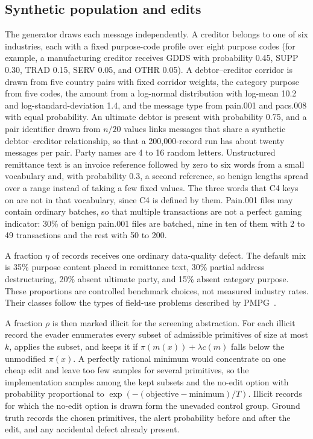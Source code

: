 \documentclass[conference]{IEEEtran}
\begin{document}
\subsection{Synthetic population and edits}
The generator draws each message independently. A creditor belongs to one of
six industries, each with a fixed purpose-code profile over eight purpose
codes (for example, a manufacturing creditor receives GDDS with probability
0.45, SUPP 0.30, TRAD 0.15, SERV 0.05, and OTHR 0.05). A debtor--creditor
corridor is drawn from five country pairs with fixed corridor weights, the
category purpose from five codes, the amount from a log-normal distribution
with log-mean 10.2 and log-standard-deviation 1.4, and the message type from
pain.001 and pacs.008 with equal probability. An ultimate debtor is present
with probability 0.75, and a pair identifier drawn from $n/20$ values links
messages that share a synthetic debtor--creditor relationship, so that a
200,000-record run has about twenty messages per pair. Party names are 4 to
16 random letters. Unstructured remittance text is an invoice reference
followed by zero to six words from a small vocabulary and, with probability
0.3, a second reference, so benign lengths spread over a range instead of
taking a few fixed values. The three words that C4 keys on are not in that
vocabulary, since C4 is defined by them. Pain.001 files may contain
ordinary batches, so that multiple transactions are not a perfect gaming
indicator: 30\% of benign pain.001 files are batched, nine in ten of them
with 2 to 49 transactions and the rest with 50 to 200.

A fraction $\eta$ of records receives one ordinary data-quality defect. The
default mix is 35\% purpose content placed in remittance text, 30\% partial
address destructuring, 20\% absent ultimate party, and 15\% absent category
purpose. These proportions are controlled benchmark choices, not measured
industry rates. Their classes follow the types of field-use problems described
by PMPG~\cite{pmpg2024}.

A fraction $\rho$ is then marked illicit for the screening abstraction. For
each illicit record the evader enumerates every subset of admissible
primitives of size at most $k$, applies the subset, and keeps it if
$\pi(m(x))+\lambda c(m)$ falls below the unmodified $\pi(x)$. A perfectly
rational minimum would concentrate on one cheap edit and leave too few samples
for several primitives, so the implementation samples among the kept subsets
and the no-edit option with probability proportional to
$\exp(-(\text{objective}-\text{minimum})/T)$. Illicit records for which the
no-edit option is drawn form the unevaded control group. Ground truth records
the chosen primitives, the alert probability before and after the edit, and
any accidental defect already present.
\end{document}
